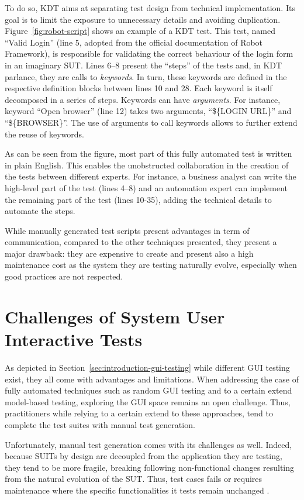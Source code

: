 To do so, KDT\cite{Tang2008, Hametner2012} aims at separating test design from technical implementation. Its goal is to limit the exposure to unnecessary details and avoiding duplication. Figure~\ref{fig:robot-script} shows an example of a KDT test. This test, named ``Valid Login'' (line 5, adopted from the official documentation of Robot Framework), is responsible for validating the correct behaviour of the login form in an imaginary SUT. Lines 6--8 present the ``steps'' of the tests and, in KDT parlance, they are calls to \emph{keywords}. In turn, these keywords are defined in the respective definition blocks between lines 10 and 28. Each keyword is itself decomposed in a series of steps. Keywords can have \emph{arguments}. For instance, keyword ``Open browser'' (line 12) takes two arguments, ``\$\{LOGIN URL\}'' and ``\$\{BROWSER\}''. The use of arguments to call keywords allows to further extend the reuse of keywords.

As can be seen from the figure, most part of this fully automated test is written in plain English. This enables the unobstructed collaboration in the creation of the tests between different experts. For instance, a business analyst can write the high-level part of the test (lines 4--8) and an automation expert can implement the remaining part of the test (lines 10-35), adding the technical details to automate the steps.

While manually generated test scripts present advantages in term of communication, compared to the other techniques presented, they present a major drawback: they are expensive to create and present also a high maintenance cost as the system they are testing naturally evolve, especially when good practices are not respected.

\section{Challenges of System User Interactive Tests}

As depicted in Section~\ref{sec:introduction-gui-testing} while different GUI testing exist, they all come with advantages and limitations. When addressing the case of fully automated techniques such as random GUI testing and to a certain extend model-based testing, exploring the GUI space remains an open challenge. Thus, practitioners while relying to a certain extend to these approaches, tend to complete the test suites with manual test generation.

Unfortunately, manual test generation comes with its challenges as well. Indeed, because SUITs by design are decoupled from the application they are testing, they tend to be more fragile, \ie breaking following non-functional changes resulting from the natural evolution of the SUT. Thus, test cases fails or requires maintenance where the specific functionalities it tests remain unchanged \cite{Coppola2019, DiMartino2021}.

